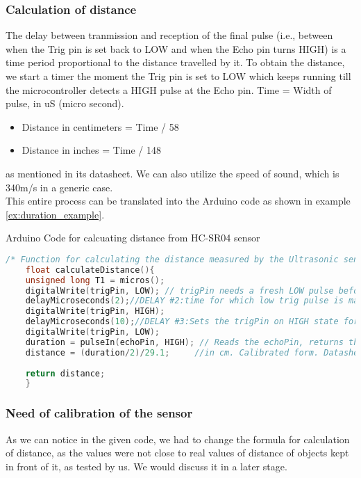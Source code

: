 \subsubsection{Calculation of distance}
The delay between tranmission and reception of the final pulse (i.e., between when the Trig pin is set back to LOW and when the Echo pin turns HIGH) is a time period proportional to the distance travelled by it. To obtain the distance, we start a timer the moment the Trig pin is set to LOW which keeps running till the microcontroller detects a HIGH pulse at the Echo pin.
Time = Width of pulse, in uS (micro second).
\begin{itemize}
	\item Distance in centimeters = Time / 58
	\item Distance in inches = Time / 148
\end{itemize}
as mentioned in its datasheet. We can also utilize the speed of sound, which is 340m/s in a generic case.\\
This entire process can be translated into the Arduino code as shown in example \ref{ex:duration_example}.
\begin{example}{Arduino Code for calcuating distance from HC-SR04 sensor}
\label{ex:duration_example}
\begin{mdframed}[backgroundcolor=light-gray, roundcorner=10pt,leftmargin=1, rightmargin=1, innerleftmargin=15, innertopmargin=15,innerbottommargin=15, outerlinewidth=1, linecolor=light-gray]
	\begin{lstlisting}[language = C]
	/* Function for calculating the distance measured by the Ultrasonic sensor*/
	float calculateDistance(){ 
	unsigned long T1 = micros();
	digitalWrite(trigPin, LOW); // trigPin needs a fresh LOW pulse before sending a HIGH pulse that can be detected from echoPin
	delayMicroseconds(2);//DELAY #2:time for which low trig pulse is maintained before making it high
	digitalWrite(trigPin, HIGH); 
	delayMicroseconds(10);//DELAY #3:Sets the trigPin on HIGH state for 10 micro seconds
	digitalWrite(trigPin, LOW);
	duration = pulseIn(echoPin, HIGH); // Reads the echoPin, returns the sound wave travel time in microseconds
	distance = (duration/2)/29.1;     //in cm. Calibrated form. Datasheet shows "duration/58" as the formula
	
	return distance;
	}
	\end{lstlisting}
	
\end{mdframed}
\end{example}
\subsubsection{Need of calibration of the sensor}
As we can notice in the given code, we had to change the formula for calculation of distance, as the values were not close to real values of distance of objects kept in front of it, as tested by us. We would discuss it in a later stage.

